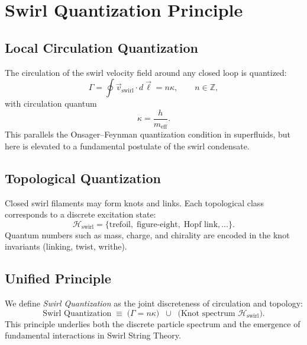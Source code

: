\documentclass[11pt]{article}
\begin{document}
    \section{Swirl Quantization Principle}

    \subsection{Local Circulation Quantization}
    The circulation of the swirl velocity field around any closed loop is quantized:
    \begin{equation}
        \Gamma = \oint \vec{v}_{\text{swirl}} \cdot d\vec{\ell}
        = n \kappa,
        \qquad n \in \mathbb{Z},
    \end{equation}
    with circulation quantum
    \begin{equation}
        \kappa = \frac{h}{m_\text{eff}}.
    \end{equation}
    This parallels the Onsager--Feynman quantization condition in superfluids, but here is elevated to a fundamental postulate of the swirl condensate.

    \subsection{Topological Quantization}
    Closed swirl filaments may form knots and links. Each topological class corresponds to a discrete excitation state:
    \begin{equation}
        \mathcal{H}_\text{swirl}
        = \{ \text{trefoil}, \; \text{figure-eight}, \; \text{Hopf link}, \dots \}.
    \end{equation}
    Quantum numbers such as mass, charge, and chirality are encoded in the knot invariants (linking, twist, writhe).

    \subsection{Unified Principle}
    We define \emph{Swirl Quantization} as the joint discreteness of circulation and topology:
    \[
        \text{Swirl Quantization} \;\equiv\;
        \Big( \Gamma = n\kappa \Big)
        \;\; \cup \;\;
        \Big( \text{Knot spectrum } \mathcal{H}_\text{swirl} \Big).
    \]
    This principle underlies both the discrete particle spectrum and the emergence of fundamental interactions in Swirl String Theory.
\end{document}
